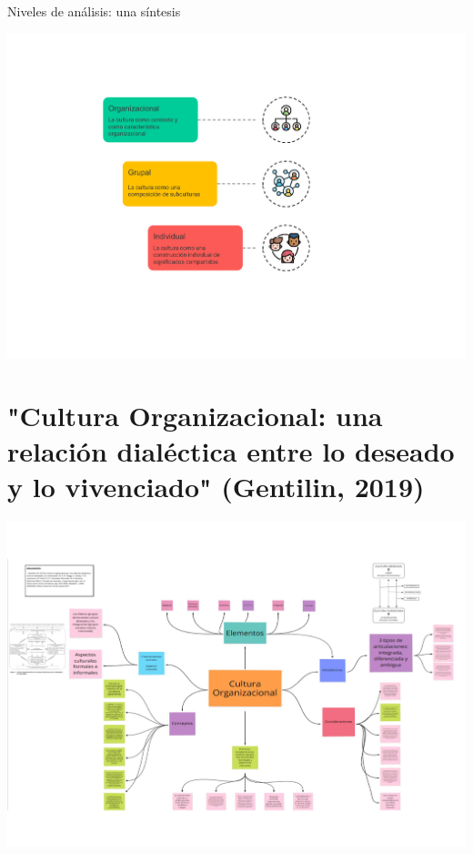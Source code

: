 \documentclass[aspectratio=169]{beamer}
\begin{document}
	\begin{frame}{Niveles de análisis: una síntesis}
		\begin{center}
			\includegraphics[height=\textheight]{./figures/sintesis.pdf}
		\end{center}
	\end{frame}
	\section{"Cultura Organizacional: una relación dialéctica entre lo deseado y lo vivenciado" (Gentilin, 2019)}
	\begin{frame}
		\begin{center}
			\includegraphics[height=\textheight]{./figures/L10.pdf}
		\end{center}
	\end{frame}
\end{document}
